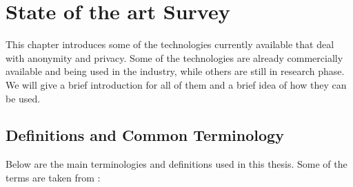 \chapter{State of the art Survey}

This chapter introduces some of the technologies currently available that deal with anonymity and privacy. Some of the technologies are already commercially available and being used in the industry, while others are still in research phase. We will give a brief introduction for all of them and a brief idea of how they can be used.

\section{Definitions and Common Terminology}
Below are the main terminologies and definitions used in this thesis. Some of the terms are taken from \cite{goldberg2000pseudonymous}:
